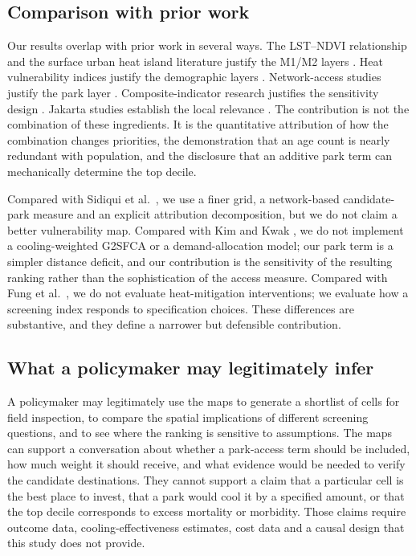 \documentclass[times,twoside]{_Templates/MultiTargetManuscript}
\begin{document}
\subsection{Comparison with prior work}

Our results overlap with prior work in several ways. The LST--NDVI relationship
and the surface urban heat island literature justify the M1/M2 layers
\citep{oke1982,voogt2003,weng2004,estoque2017}. Heat vulnerability indices
justify the demographic layers \citep{reid2009,wolf2013}. Network-access studies
justify the park layer \citep{oh2007,kim2026,feng2019}. Composite-indicator
research justifies the sensitivity design \citep{saisana2005,paruolo2013,greco2019}.
Jakarta studies establish the local relevance \citep{siswanto2023,putra2021,rizki2024,varquez2020}.
The contribution is not the combination of these ingredients. It is the
quantitative attribution of how the combination changes priorities, the
demonstration that an age count is nearly redundant with population, and the
disclosure that an additive park term can mechanically determine the top decile.

Compared with Sidiqui et al.\ \citep{sidiqui2022}, we use a finer grid, a
network-based candidate-park measure and an explicit attribution decomposition,
but we do not claim a better vulnerability map. Compared with Kim and Kwak
\citep{kim2026}, we do not implement a cooling-weighted G2SFCA or a
demand-allocation model; our park term is a simpler distance deficit, and our
contribution is the sensitivity of the resulting ranking rather than the
sophistication of the access measure. Compared with Fung et al.\
\citep{fung2024}, we do not evaluate heat-mitigation interventions; we evaluate
how a screening index responds to specification choices. These differences are
substantive, and they define a narrower but defensible contribution.

\subsection{What a policymaker may legitimately infer}

A policymaker may legitimately use the maps to generate a shortlist of cells for
field inspection, to compare the spatial implications of different screening
questions, and to see where the ranking is sensitive to assumptions. The maps
can support a conversation about whether a park-access term should be included,
how much weight it should receive, and what evidence would be needed to verify
the candidate destinations. They cannot support a claim that a particular cell
is the best place to invest, that a park would cool it by a specified amount, or
that the top decile corresponds to excess mortality or morbidity. Those claims
require outcome data, cooling-effectiveness estimates, cost data and a causal
design that this study does not provide.
\end{document}
